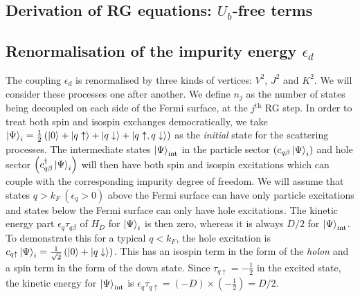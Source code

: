 \documentclass{report}
\numberwithin{equation}{section}
\begin{document}
\begin{appendices}

\appendixtitleon

\chapter{Derivation of RG equations: \(U_b\)-free terms}
\section{Renormalisation of the impurity energy \(\epsilon_d\)}
The coupling \(\epsilon_d\) is renormalised by three kinds of vertices: \(V^2\), \(J^2\) and \(K^2\). We will consider these processes one after another. We define \(n_j\) as the number of states being decoupled on each side of the Fermi surface, at the \(j^\text{th}\) RG step. In order to treat both spin and isospin exchanges democratically, we take \(\ket{\Psi}_i = \frac{1}{2}\left(\ket{0} + \ket{q\uparrow} + \ket{q\downarrow} + \ket{q\uparrow, q\downarrow}\right) \) as the \textit{initial} state for the scattering processes. The intermediate states \(\ket{\Psi}_\text{int}\) in the particle sector \(\left(c_{q\beta}\ket{\Psi}_i\right)\) and hole sector \(\left(c^\dagger_{q\beta}\ket{\Psi}_i\right)\) will then have both spin and isospin excitations which can couple with the corresponding impurity degree of freedom. We will assume that states  \(q > k_F~\left(\epsilon_q > 0\right) \) above the Fermi surface can have only particle excitations and states below the Fermi surface can only have hole excitations. The kinetic energy part \(\epsilon_q \tau_{q\beta}\) of \(H_D\) for \(\ket{\Psi}_i\) is then zero, whereas it is always \(D/2\) for \(\ket{\Psi}_\text{int}\). To demonstrate this for a typical \(q < k_F\), the hole excitation is \(c_{q \uparrow}\ket{\Psi}_i = \frac{1}{\sqrt 2}\left(\ket{0} + \ket{q \downarrow}\right)\). This has an isospin term in the form of the \textit{holon} and a spin term in the form of the down state. Since \(\tau_{q \uparrow} = -\frac{1}{2}\) in the excited state, the kinetic energy for \(\ket{\Psi}_\text{int}\) is \(\epsilon_q \tau_{q \uparrow} = \left(-D\right)\times\left(-\frac{1}{2}\right) = D/2\).


\end{appendices}
\end{document}
